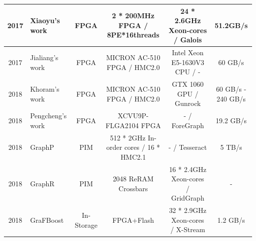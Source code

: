 \documentclass[twoside]{article}
\begin{document}
\begin{multicols}{2}
\begin{table}[]
{\begin{tabular}{|c|l|c|c|c|c|}
2017        & Xiaoyu's work \cite{Ma2017fpgahtm}                               & FPGA                  & 2 * 200MHz FPGA / 8PE*16threads         & 24 * 2.6GHz Xeon-cores / Galois      & 51.2GB/s             \\ \hline
2017        & Jialiang's work \cite{Zhang2017fpgahmcbfs}                       & FPGA                  & MICRON AC-510 FPGA / HMC2.0             & Intel Xeon E5-1630V3 CPU / -         & 60 GB/s                   \\ \hline
2018        & Khoram's work \cite{Khoram2018fpgaco-optimizinghmc}              & FPGA                  & MICRON AC-510 FPGA / HMC2.0             & GTX 1060 GPU / Gunrock               & 60 GB/s - 240 GB/s                  \\ \hline
2018        & Pengcheng's work \cite{yao2018pact}                              & FPGA                  & XCVU9P-FLGA2104 FPGA                    & - / ForeGraph                        & 19.2 GB/s           \\ \hline
2018        & GraphP \cite{zhang2018graphp}                                    & PIM                   & 512 * 2GHz In-order cores / 16 * HMC2.1 & - / Tesseract                        & 5 TB/s              \\ \hline
2018        & GraphR \cite{song2018graphr}                                     & PIM                   & 2048 ReRAM Crossbars                    & 16 * 2.4GHz Xeon-cores / GridGraph   & -                    \\ \hline
2018        & GraFBoost \cite{JUN2018GRAFBOOST}                                & In-Storage            & FPGA+Flash                              & 32 * 2.9GHz Xeon-cores / X-Stream    & 1.2 GB/s           \\ \hline
\end{tabular}%
}
\end{table}


\end{multicols}
\end{document}
